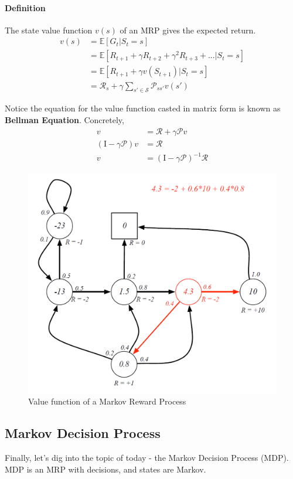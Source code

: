	\paragraph{Definition} The state value function $v(s)$ of an MRP gives the expected return.
	\begin{align*}
	v(s) &= \mathbb{E}[G_t | S_t = s] \\
	&= \mathbb{E}[R_{t+1} + \gamma R_{t+2} + \gamma^2 R_{t+3} + ... | S_t = s] \\
	&= \mathbb{E}[R_{t+1} + \gamma v(S_{t+1}) | S_t = s] \\
	&= \mathcal{R}_s + \gamma\sum_{s' \in \mathcal{S}}\mathcal{P}_{ss'}v(s')
	\end{align*}

	Notice the equation for the value function casted in matrix form is known as \textbf{Bellman Equation}. Concretely,
	\begin{align*}
	v &= \mathcal{R + \gamma P}v \\
	(\mathrm{I}- \gamma\mathcal{P})v &= \mathcal{R} \\
	v &= (\mathrm{I}- \gamma\mathcal{P})^{-1}\mathcal{R}
	\end{align*} 
	\begin{figure}[h]
	\centering
	\includegraphics[scale=0.5]{ch2fig1.png}
	\caption{Value function of a Markov Reward Process}
	\end{figure}

	
	\subsection{Markov Decision Process}
	Finally, let's dig into the topic of today - the Markov Decision Process (MDP). MDP is an MRP with decisions, and states are Markov.
